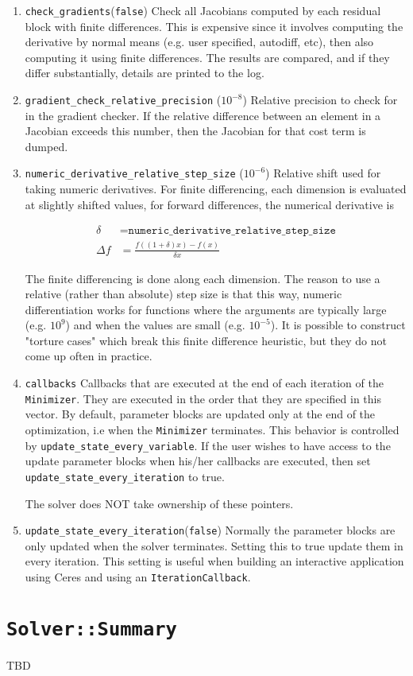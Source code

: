 \begin{enumerate}
\item{\texttt{check\_gradients}}(\texttt{false})
 Check all Jacobians computed by each residual block with finite
     differences. This is expensive since it involves computing the
     derivative by normal means (e.g. user specified, autodiff,
     etc), then also computing it using finite differences. The
     results are compared, and if they differ substantially, details
     are printed to the log.

\item{\texttt{gradient\_check\_relative\_precision}} ($10^{-8}$)
  Relative precision to check for in the gradient checker. If the
  relative difference between an element in a Jacobian exceeds
  this number, then the Jacobian for that cost term is dumped.

\item{\texttt{numeric\_derivative\_relative\_step\_size}} ($10^{-6}$)
 Relative shift used for taking numeric derivatives. For finite
     differencing, each dimension is evaluated at slightly shifted
     values, \eg for forward differences, the numerical derivative is
  
\begin{align}
       \delta &= \texttt{numeric\_derivative\_relative\_step\_size}\\
       \Delta f &= \frac{f((1 + \delta)  x) - f(x)}{\delta x}
\end{align} 


     The finite differencing is done along each dimension. The
     reason to use a relative (rather than absolute) step size is
     that this way, numeric differentiation works for functions where
     the arguments are typically large (e.g. $10^9$) and when the
     values are small (e.g. $10^{-5}$). It is possible to construct
     "torture cases" which break this finite difference heuristic,
     but they do not come up often in practice.

\item{\texttt{callbacks}} 
  Callbacks that are executed at the end of each iteration of the
     \texttt{Minimizer}. They are executed in the order that they are
     specified in this vector. By default, parameter blocks are
     updated only at the end of the optimization, i.e when the
     \texttt{Minimizer} terminates. This behavior is controlled by
     \texttt{update\_state\_every\_variable}. If the user wishes to have access
     to the update parameter blocks when his/her callbacks are
     executed, then set \texttt{update\_state\_every\_iteration} to true.
    
     The solver does NOT take ownership of these pointers.

\item{\texttt{update\_state\_every\_iteration}}(\texttt{false})
Normally the parameter blocks are only updated when the solver terminates. Setting this to true update them in every iteration. This setting is useful when building an interactive application using Ceres and using an \texttt{IterationCallback}.
\end{enumerate}

\section{\texttt{Solver::Summary}}
TBD